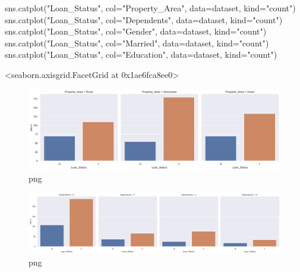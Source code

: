 \documentclass[]{article}
\newenvironment{Shaded}{}{}
\newcommand{\NormalTok}[1]{#1}
\newcommand{\OperatorTok}[1]{\textcolor[rgb]{0.40,0.40,0.40}{#1}}
\newcommand{\StringTok}[1]{\textcolor[rgb]{0.25,0.44,0.63}{#1}}
\begin{document}
\begin{Shaded}
\begin{Highlighting}[]
\NormalTok{sns.catplot(}\StringTok{"Loan_Status"}\NormalTok{, col}\OperatorTok{=}\StringTok{"Property_Area"}\NormalTok{, data}\OperatorTok{=}\NormalTok{dataset, kind}\OperatorTok{=}\StringTok{"count"}\NormalTok{)}
\NormalTok{sns.catplot(}\StringTok{"Loan_Status"}\NormalTok{, col}\OperatorTok{=}\StringTok{"Dependents"}\NormalTok{, data}\OperatorTok{=}\NormalTok{dataset, kind}\OperatorTok{=}\StringTok{"count"}\NormalTok{)}
\NormalTok{sns.catplot(}\StringTok{"Loan_Status"}\NormalTok{, col}\OperatorTok{=}\StringTok{"Gender"}\NormalTok{, data}\OperatorTok{=}\NormalTok{dataset, kind}\OperatorTok{=}\StringTok{"count"}\NormalTok{)}
\NormalTok{sns.catplot(}\StringTok{"Loan_Status"}\NormalTok{, col}\OperatorTok{=}\StringTok{"Married"}\NormalTok{, data}\OperatorTok{=}\NormalTok{dataset, kind}\OperatorTok{=}\StringTok{"count"}\NormalTok{)}
\NormalTok{sns.catplot(}\StringTok{"Loan_Status"}\NormalTok{, col}\OperatorTok{=}\StringTok{"Education"}\NormalTok{, data}\OperatorTok{=}\NormalTok{dataset, kind}\OperatorTok{=}\StringTok{"count"}\NormalTok{)}
\end{Highlighting}
\end{Shaded}

\textless{}seaborn.axisgrid.FacetGrid at 0x1ae6fca8ee0\textgreater{}

\begin{figure}
\centering
\includegraphics{notebook_files/notebook_20_1.png}
\caption{png}
\end{figure}

\begin{figure}
\centering
\includegraphics{notebook_files/notebook_20_2.png}
\caption{png}
\end{figure}
\end{document}
